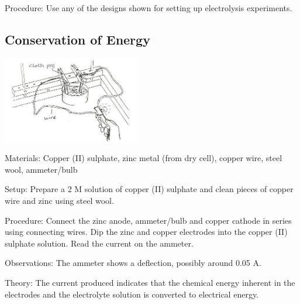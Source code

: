 \begin{multicols}{2}
\begin{description*}
\item[Procedure:]{Use any of the designs shown for setting up electrolysis experiments.}
\end{description*}

\subsection{Conservation of Energy} %

\begin{center}
\includegraphics[width=0.45\textwidth]{./img/source/chem-energy.jpg}
\end{center}

\begin{description*}
\item[Materials:]{Copper (II) sulphate, zinc metal (from dry cell), copper wire, steel wool, ammeter/bulb}
\item[Setup:]{Prepare a 2 M solution of copper (II) sulphate and clean pieces of copper wire and zinc using steel wool.}
\item[Procedure:]{Connect the zinc anode, ammeter/bulb and copper cathode in series using connecting wires. Dip the zinc and copper electrodes into the copper (II) sulphate solution. Read the current on the ammeter.}
\item[Observations:]{The ammeter shows a deflection, possibly around 0.05 A.}
\item[Theory:]{The current produced indicates that the chemical energy inherent in the electrodes and the electrolyte solution is converted to electrical energy.}
\end{description*}


\end{multicols}
